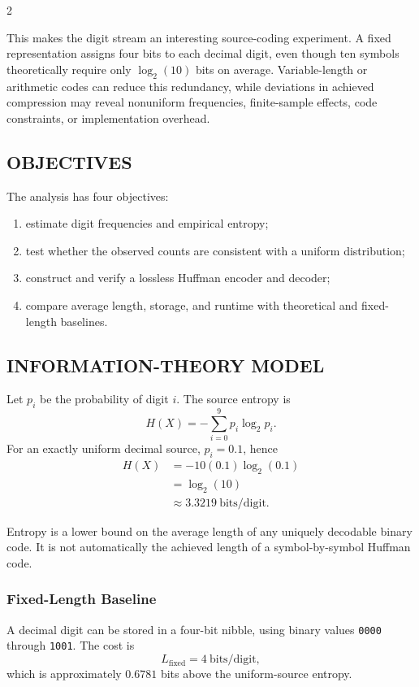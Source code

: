 \begin{multicols}{2}
  \noindent
  { This makes the digit stream an interesting source-coding experiment. A fixed representation assigns four bits to each decimal digit, even though ten symbols theoretically require only $\log_2(10)$ bits on average. Variable-length or arithmetic codes can reduce this redundancy, while deviations in achieved compression may reveal nonuniform frequencies, finite-sample effects, code constraints, or implementation overhead.\par}

  \subsection*{\centering\uppercase{Objectives}}
  The analysis has four objectives:
  \begin{enumerate}\justifying\setlength{\itemsep}{0pt}\setlength{\parsep}{0pt}\setlength{\topsep}{2pt}\setlength{\partopsep}{0pt}
    \item estimate digit frequencies and empirical entropy;
    \item test whether the observed counts are consistent with a uniform distribution;
    \item construct and verify a lossless Huffman encoder and decoder;
    \item compare average length, storage, and runtime with theoretical and fixed-length baselines.
  \end{enumerate}

  \subsection*{\centering\uppercase{Information-Theory Model}}
  Let $p_i$ be the probability of digit $i$. The source entropy is
  \[
    H(X)=-\sum_{i=0}^{9}p_i\log_2p_i.
  \]
  For an exactly uniform decimal source, $p_i=0.1$, hence
  \[
    \begin{aligned}
      H(X)&=-10(0.1)\log_2(0.1)\\
          &=\log_2(10)\\
          &\approx3.3219\ \text{bits/digit}.
    \end{aligned}
  \]
  { Entropy is a lower bound on the average length of any uniquely decodable binary code. It is not automatically the achieved length of a symbol-by-symbol Huffman code.\par}

  \subsubsection*{Fixed-Length Baseline}
  A decimal digit can be stored in a four-bit nibble, using binary values \texttt{0000} through \texttt{1001}. The cost is
  \[
    L_{\mathrm{fixed}}=4\ \text{bits/digit},
  \]
  which is approximately $0.6781$ bits above the uniform-source entropy.


\end{multicols}
